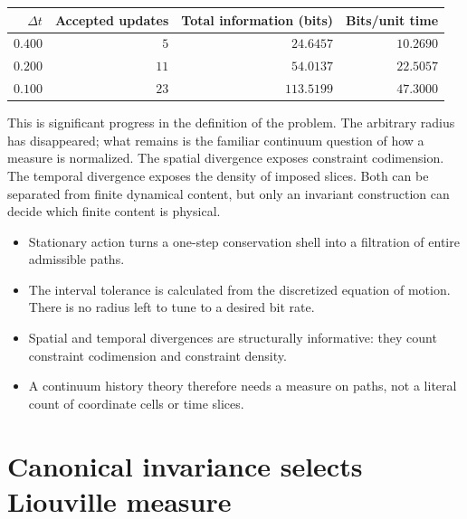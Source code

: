 \documentclass[10pt]{article}
\newenvironment{persuasions}
  {\begin{cpbox}\small\setlength{\parskip}{0pt}%
   {\footnotesize\bfseries\color{accent}%
    \textls[110]{CONCEPTUAL PERSUASIONS}}\par\vspace{3pt}%
   \begin{itemize}[leftmargin=1.15em,itemsep=2.5pt,topsep=0pt,parsep=0pt,
                   label=\textcolor{accent}{\scriptsize$\blacktriangleright$}]}
  {\end{itemize}\end{cpbox}}
\begin{document}
\begin{center}
\label{tab:action-time}
\small
\begin{tabular}{rrrr}
\toprule
$\Delta t$ & Accepted updates & Total information (bits) & Bits/unit time\\
\midrule
$0.400$ & $5$ & $24.6457$ & $10.2690$\\
$0.200$ & $11$ & $54.0137$ & $22.5057$\\
$0.100$ & $23$ & $113.5199$ & $47.3000$\\
\bottomrule
\end{tabular}
\end{center}

This is significant progress in the definition of the problem.  The arbitrary
radius has disappeared; what remains is the familiar continuum question of
how a measure is normalized.  The spatial divergence exposes constraint
codimension.  The temporal divergence exposes the density of imposed slices.
Both can be separated from finite dynamical content, but only an invariant
construction can decide which finite content is physical.

\begin{persuasions}
\item Stationary action turns a one-step conservation shell into a filtration
of entire admissible paths.
\item The interval tolerance is calculated from the discretized equation of
motion.  There is no radius left to tune to a desired bit rate.
\item Spatial and temporal divergences are structurally informative: they
count constraint codimension and constraint density.
\item A continuum history theory therefore needs a measure on paths, not a
literal count of coordinate cells or time slices.
\end{persuasions}

\section*{Canonical invariance selects Liouville measure}
\end{document}
